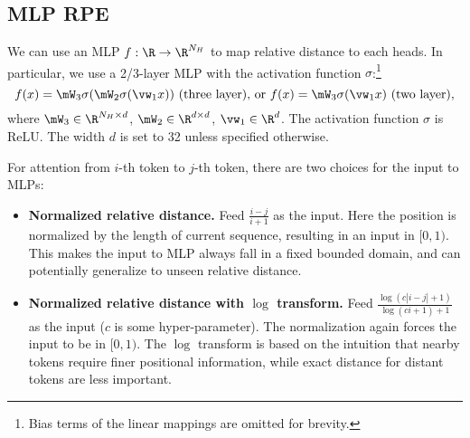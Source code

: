 \subsection{MLP RPE}
We can use an MLP $f: \R\to \R^{N_H}$ to map relative distance to each heads. In particular, we use a 2/3-layer MLP with the activation function $\sigma$:\footnote{Bias terms of the linear mappings are omitted for brevity.}
\begin{equation*}
    f(x)=\mW_3\sigma(\mW_2 \sigma(\vw_1 x))\text{ (three layer), or }f(x)=\mW_3\sigma(\vw_1 x)\text{ (two layer)},
\end{equation*}
where $\mW_3\in\R^{N_H\times d}$, $\mW_2\in\R^{d\times d}$, $\vw_1\in\R^{d}$. The activation function $\sigma$ is $\mathrm{ReLU}$. The width $d$ is set to 32 unless specified otherwise.

For attention from $i$-th token to $j$-th token, there are two choices for the input to MLPs:
\begin{itemize}
    \item \textbf{Normalized relative distance.} Feed $\frac{i-j}{i+1}$ as the input. Here the position is normalized by the length of current sequence, resulting in an input in $[0,1)$. This makes the input to MLP always fall in a fixed bounded domain, and can potentially generalize to unseen relative distance. 
    \item \textbf{Normalized relative distance with $\log$ transform.} Feed $\frac{\log(c|i-j|+1)}{\log(ci+1)+1}$ as the input ($c$ is some hyper-parameter). The normalization again forces the input to be in $[0,1)$. The $\log$ transform is based on the intuition that nearby tokens require finer positional information, while exact distance for distant tokens are less important.
\end{itemize}


